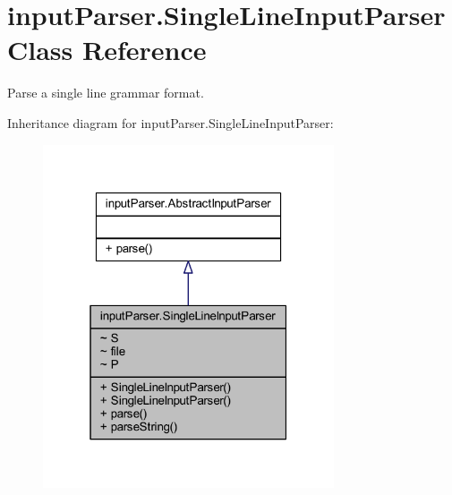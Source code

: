 \hypertarget{classinput_parser_1_1_single_line_input_parser}{\section{input\-Parser.\-Single\-Line\-Input\-Parser Class Reference}
\label{classinput_parser_1_1_single_line_input_parser}
}


Parse a single line grammar format.  




Inheritance diagram for input\-Parser.\-Single\-Line\-Input\-Parser\-:
\nopagebreak
\begin{figure}[H]
\begin{center}
\leavevmode
\includegraphics[width=244pt]{classinput_parser_1_1_single_line_input_parser__inherit__graph}
\end{center}
\end{figure}


